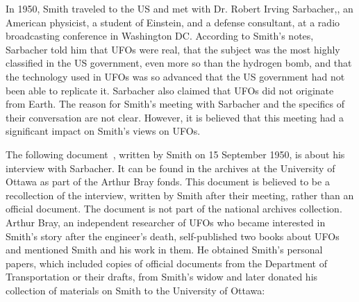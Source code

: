 In 1950, Smith traveled to the US and met with Dr. Robert Irving Sarbacher,, an American physicist, a student of Einstein, and a defense consultant, at a radio broadcasting conference in Washington DC. According to Smith's notes, Sarbacher told him that UFOs were real, that the subject was the most highly classified in the US government, even more so than the hydrogen bomb, and that the technology used in UFOs was so advanced that the US government had not been able to replicate it. Sarbacher also claimed that UFOs did not originate from Earth. The reason for Smith's meeting with Sarbacher and the specifics of their conversation are not clear. However, it is believed that this meeting had a significant impact on Smith's views on UFOs.

The following document~\cite{SmithWilbertNotes}, written by Smith on 15 September 1950, is about his interview with Sarbacher. It can be found in the archives at the University of Ottawa as part of the Arthur Bray fonds. This document is believed to be a recollection of the interview, written by Smith after their meeting, rather than an official document. The document is not part of the national archives collection. Arthur Bray, an independent researcher of UFOs who became interested in Smith's story after the engineer's death, self-published two books about UFOs and mentioned Smith and his work in them. He obtained Smith's personal papers, which included copies of official documents from the Department of Transportation or their drafts, from Smith's widow and later donated his collection of materials on Smith to the University of Ottawa:

